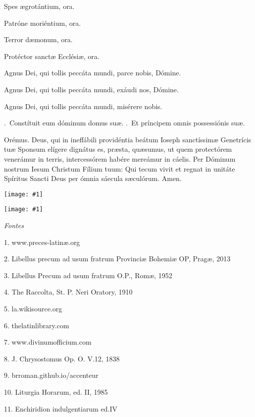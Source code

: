 \documentclass[12pt,a6paper]{book}
\makeatletter
\DeclareRobustCommand{\V}{\textbf{\vers@resp{-0.1em}{V}}.~}
\DeclareRobustCommand{\R}{\textbf{\vers@resp{0pt}{R}}.~}
\newcommand{\vers@resp@sym}{\raisebox{0.2ex}{\rotatebox[origin=c]{-20}{$\m@th\rceil$}}}
\newcommand{\vers@resp}[2]{%
  {\ooalign{\hidewidth\kern#1\vers@resp@sym\hidewidth\cr#2\cr}}%
}
\newcommand{\centeredtext}[1]{\parbox{\linewidth}{\centering\textit{#1}}}
\newcommand{\myimage}[2]{
\begin{center}
\texttt{[image: \#1]}
\end{center}}
\makeatother
\begin{document}
\begin{sloppy}
Spes ægrotántium, ora.

Patróne moriéntium, ora.

Terror dæmonum, ora.

Protéctor sanctæ Ecclésiæ, ora.

\vspace{3mm}

Agnus Dei, qui tollis peccáta mundi, parce nobis, Dómine.  

Agnus Dei, qui tollis peccáta mundi, exáudi nos, Dómine.  

Agnus Dei, qui tollis peccáta mundi, misérere nobis.  

\V Constítuit eum dóminum domus suæ.
\R Et príncipem omnis possessiónis suæ.

Orémus. Deus, qui in ineffábili providéntia beátum Ioseph sanctíssimæ Genetrícis tuæ Sponsum elígere dignátus es, præsta, quæsumus, ut quem protectórem venerámur in terris, intercessórem habére mereámur in cáelis. Per Dóminum nostrum Iesum Christum Fílium tuum: Qui tecum vivit et regnat in unitáte Spíritus Sancti Deus per ómnia sáecula sæculórum. Amen.

\myimage{cross1}{35pt}


\end{sloppy}

\pagebreak

\pagestyle{plain}
\setlength{\cftbeforetoctitleskip}{-1em}
\setlength{\cftaftertoctitleskip}{-0.8em}
\renewcommand{\contentsname}{\normalsize \centeredtext{INDEX GENERALIS}}   


\tableofcontents

\vfill

\myimage{amdg}{100pt}

\vfill

\pagebreak

\centeredtext{Fontes}

\vspace{2mm}

1. www.preces-latinæ.org

2. Libellus precum ad usum fratrum Provinciæ Bohemiæ OP, Pragæ, 2013

3. Libellus Precum ad usum fratrum O.P., Romæ, 1952

4. The Raccolta, St. P. Neri Oratory, 1910

5. la.wikisource.org

6. thelatinlibrary.com

7. www.divinumofficium.com

8. J. Chrysostomus Op. O. V.12, 1838

9. brroman.github.io/accenteur

10. Liturgia Horarum, ed. II, 1985

11. Enchiridion indulgentiarum ed.IV
\end{document}
